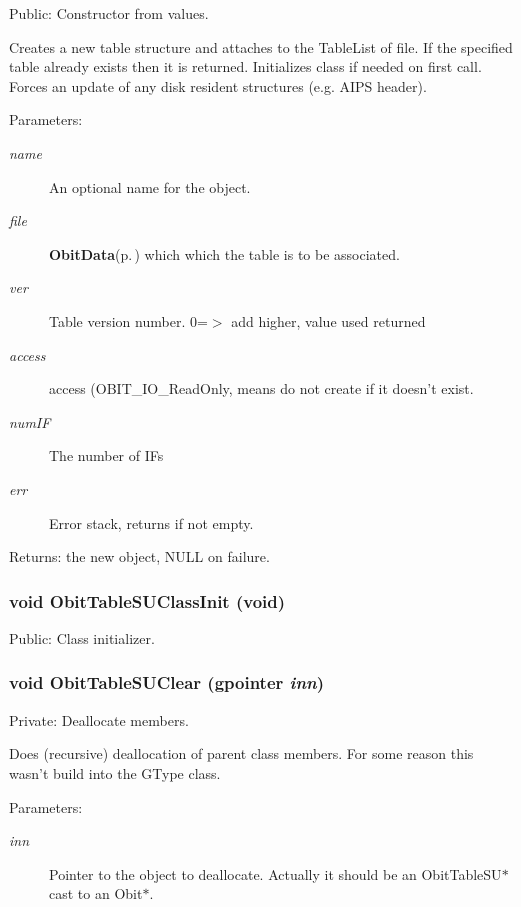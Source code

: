 Public: Constructor from values. 

Creates a new table structure and attaches to the Table\-List of file. If the specified table already exists then it is returned. Initializes class if needed on first call. Forces an update of any disk resident structures (e.g. AIPS header). \begin{Desc}
\item[Parameters:]
\begin{description}
\item[{\em name}]An optional name for the object. \item[{\em file}]{\bf Obit\-Data}{\rm (p.\,\pageref{structObitData})} which which the table is to be associated. \item[{\em ver}]Table version number. 0=$>$ add higher, value used returned \item[{\em access}]access (OBIT\_\-IO\_\-Read\-Only, means do not create if it doesn't exist. \item[{\em num\-IF}]The number of IFs \item[{\em err}]Error stack, returns if not empty. \end{description}
\end{Desc}
\begin{Desc}
\item[Returns:]the new object, NULL on failure. \end{Desc}
\subsubsection{\setlength{\rightskip}{0pt plus 5cm}void Obit\-Table\-SUClass\-Init (void)}\label{ObitTableSU_8c_a27}


Public: Class initializer. 

\subsubsection{\setlength{\rightskip}{0pt plus 5cm}void Obit\-Table\-SUClear (gpointer {\em inn})}\label{ObitTableSU_8c_a9}


Private: Deallocate members. 

Does (recursive) deallocation of parent class members. For some reason this wasn't build into the GType class. \begin{Desc}
\item[Parameters:]
\begin{description}
\item[{\em inn}]Pointer to the object to deallocate. Actually it should be an Obit\-Table\-SU$\ast$ cast to an Obit$\ast$. \end{description}
\end{Desc}
